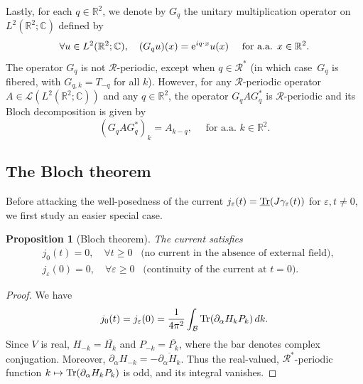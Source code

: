 \documentclass[a4paper,11pt]{article}
\theoremstyle{plain}
\newtheorem{proposition}[theorem]{Proposition}
\theoremstyle{remark}
\def\R{{\mathbb R}}
\def\C{{\mathbb C}}
\def\eps{{\varepsilon}}
\def\cR{{\mathcal R}}
\begin{document}
Lastly, for each $q \in \R^2$, we denote by $G_q$ the unitary multiplication operator on $L^2(\R^2;\C)$ defined by
\begin{equation}\label{eq:defGq}
\forall u \in L^2(\R^2;\C), \quad (G_qu)(x) = {\rm e}^{iq\cdot x} u(x) \quad \mbox{ for a.a. } x \in \R^2.
\end{equation}
The operator $G_q$ is not $\cR$-periodic, except
when $q \in \cR^\ast$ (in which case~$G_{q}$ is fibered, with
$G_{q,k} = T_{-q}$ for all $k$). However, for any $\cR$-periodic
operator $A \in {\mathcal L}(L^2(\R^2;\C))$ and any $q \in \R^2$,
the operator $G_qAG_q^\ast$ is $\cR$-periodic and its Bloch
decomposition is given by
\begin{equation}\label{eq:fibers_eiqx}
(G_qAG_q^\ast)_k = A_{k-q}, \quad \mbox{ for a.a. } k \in \R^2.
\end{equation}


\subsection{The Bloch theorem}
Before attacking the well-posedness of the current
$j_\eps(t) = \underline {\rm Tr}(J
\gamma_\eps(t))$ for $\eps, t \neq 0$, we first study an easier special case.
\begin{proposition}[Bloch theorem]\label{prop:null_current} The current satisfies
\begin{align*}
& j_0(t) = 0, \quad \forall t \ge 0 \;\;\; \mbox{(no current in the absence of external field)}, \\
& j_\eps(0)=0, \quad \forall \eps \ge 0 \;\;\;  \mbox{(continuity of the current at $t=0$).}
\end{align*}
\end{proposition}
\begin{proof}
We have
\[
j_0(t)=j_\eps(0)=\frac1{4\pi^2}\int_\mathcal B
\Tr(\partial_\alpha H_kP_k)\,dk.
\]
Since $V$ is real, $H_{-k}=\overline{H_k}$ and $P_{-k}=\overline{P_k}$,
where the bar denotes complex conjugation. Moreover,
$\partial_\alpha H_{-k}=-\overline{\partial_\alpha H_k}$.
Thus the real-valued, $\cR^*$-periodic function
$k\mapsto\Tr(\partial_\alpha H_kP_k)$ is odd, and its integral vanishes.
\end{proof}
\end{document}
